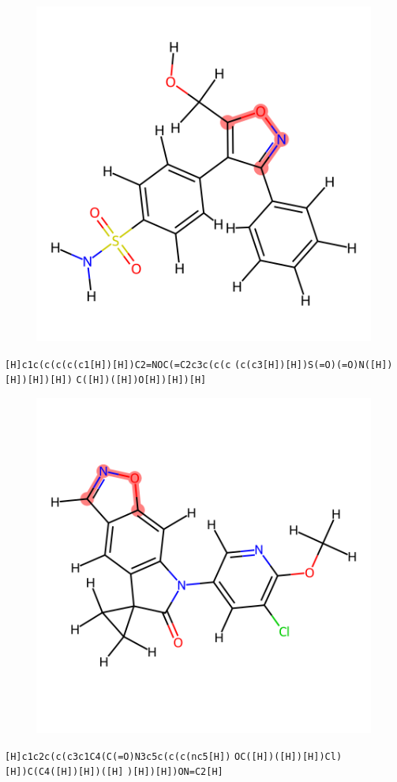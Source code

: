 \documentclass{article}
\begin{document}
\begin{figure}[ht]
\centering
    \includegraphics{mol62.png}
\end{figure}
\verb|[H]c1c(c(c(c(c1[H])[H])C2=NOC(=C2c3c(c(c| \verb|(c(c3[H])[H])S(=O)(=O)N([H])[H])[H])[H])| \verb|C([H])([H])O[H])[H])[H]|

\begin{figure}[ht]
\centering
    \includegraphics{mol63.png}
\end{figure}
\verb|[H]c1c2c(c(c3c1C4(C(=O)N3c5c(c(c(nc5[H])| \verb|OC([H])([H])[H])Cl)[H])C(C4([H])[H])([H]| \verb|)[H])[H])ON=C2[H]|
\end{document}
